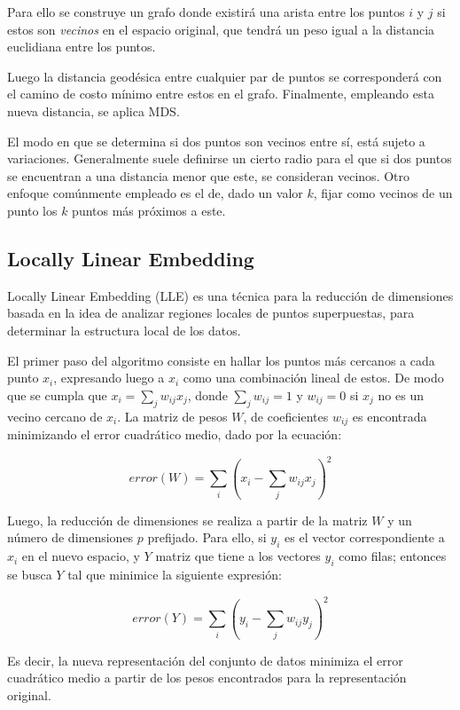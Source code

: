 Para ello se construye un grafo donde existirá una arista entre los puntos $i$ y $j$ si estos son \textit{vecinos} en el espacio original, que tendrá un peso igual a la distancia euclidiana entre los puntos.

Luego la distancia geodésica entre cualquier par de puntos se corresponderá con el camino de costo mínimo entre estos en el grafo.
Finalmente, empleando esta nueva distancia, se aplica MDS\@.

El modo en que se determina si dos puntos son vecinos entre sí, está sujeto a variaciones.
Generalmente suele definirse un cierto radio para el que si dos puntos se encuentran a una distancia menor que este, se consideran vecinos.
Otro enfoque comúnmente empleado es el de, dado un valor $k$, fijar como vecinos de un punto los $k$ puntos más próximos a este.

\subsection{Locally Linear Embedding}\label{subsec:LLE}

Locally Linear Embedding (LLE) es una técnica para la reducción de dimensiones basada en la idea de analizar regiones locales de puntos superpuestas, para determinar la estructura local de los datos.

El primer paso del algoritmo consiste en hallar los puntos más cercanos a cada punto $x_i$, expresando luego a $x_i$ como una combinación lineal de estos.
De modo que se cumpla que $x_i =\sum_j {w_{ij}x_j}$, donde $\sum_j w_{ij}=1$ y $w_{ij} = 0$ si $x_j$ no es un vecino cercano de $x_i$.
La matriz de pesos $W$, de coeficientes $w_{ij}$ es encontrada minimizando el error cuadrático medio, dado por la ecuación:

\begin{equation}
    error(W) = \sum_i \left( x_i - \sum_j {w_{ij}x_j} \right)^2
\end{equation}

Luego, la reducción de dimensiones se realiza a partir de la matriz $W$ y un número de dimensiones $p$ prefijado.
Para ello, si $y_i$ es el vector correspondiente a $x_i$ en el nuevo espacio, y $Y$ matriz que tiene a los vectores $y_i$ como filas;
entonces se busca $Y$ tal que minimice la siguiente expresión:

\begin{equation}
    error(Y) = \sum_i \left( y_i - \sum_j {w_{ij}y_j} \right)^2
\end{equation}

Es decir, la nueva representación del conjunto de datos minimiza el error cuadrático medio a partir de los pesos encontrados para la representación original.
